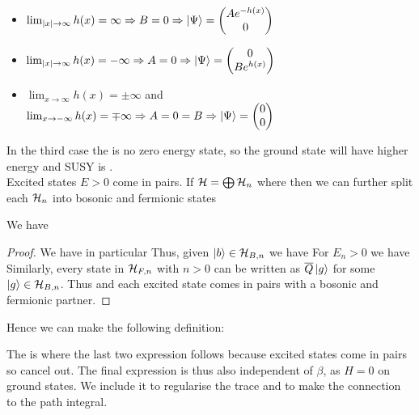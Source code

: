 \documentclass{article}
\begin{document}
\begin{itemize}
    \item $\lim_{|x|\to\infty} h(x) = \infty \Rightarrow B=0 \Rightarrow \ket{\Psi} = \begin{pmatrix} A e^{-h(x)} \\ 0 \end{pmatrix}$ 
    \item $\lim_{|x|\to\infty} h(x) = -\infty \Rightarrow A=0 \Rightarrow \ket{\Psi} = \begin{pmatrix} 0 \\ B e^{h(x)} \end{pmatrix}$ 
    \item $\lim_{x\to\infty} h(x) = \pm\infty$ and $\lim_{x\to -\infty} h(x) = \mp\infty\Rightarrow A=0=B \Rightarrow \ket{\Psi} = \begin{pmatrix} 0 \\ 0 \end{pmatrix}$ 
\end{itemize}
In the third case the is no zero energy state, so the ground state will have higher energy and SUSY is . \\
Excited states $E>0$ come in pairs. If $\mathcal{H} = \bigoplus \mathcal{H}_n$ where 
then we can further split each $\mathcal{H}_n$ into bosonic and fermionic states
\begin{prop}
	We have
\end{prop}
\begin{proof}
We have in particular 
Thus, given $\ket{b} \in \mathcal{H}_{B,n}$ we have 
For $E_n > 0$ we have 
Similarly, every state in $\mathcal{H}_{F,n}$ with $n>0$ can be written as $\overline{Q} \ket{g}$ for some $\ket{g}\in\mathcal{H}_{B,n}$. Thus 
and each excited state comes in pairs with a bosonic and fermionic partner. 
\end{proof}
Hence  we can make the following definition: 
\begin{definition}
	The  is 
	where the last two expression follows because excited states come in pairs so cancel out. The final expression is thus also independent of $\beta$, as $H=0$ on ground states. We include it to regularise the trace and to make the connection to the path integral. 
\end{definition} 
\end{document}
